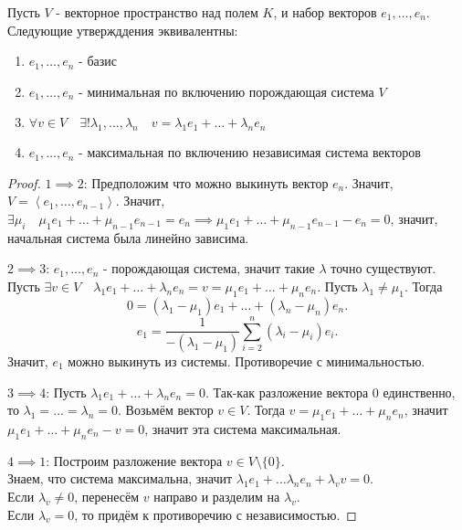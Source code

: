 \begin{statement} \thmslashn

    Пусть $V$ - векторное пространство над полем $K$, и набор векторов $e_1, \ldots, e_{n}$.
    Следующие утвержддения эквивалентны:
    \begin{enumerate}
        \item $e_1, \ldots, e_{n}$ - базис
        \item $e_1, \ldots, e_{n}$ - минимальная по включению порождающая система $V$
        \item $\forall{v\in V}\quad \exists!{\lambda_1, \ldots, \lambda_{n}}\quad v = \lambda_1e_1 + \ldots + \lambda_{n}e_{n}$ 
        \item $e_1, \ldots, e_{n}$ - максимальная по включению независимая система векторов
    \end{enumerate}
    \begin{proof} \thmslashn

        $1 \implies 2$: Предположим что можно выкинуть вектор $e_{n}$. Значит, $V = \left<e_1, \ldots, e_{n-1}\right>$. Значит, $\exists{\mu_{i}}\quad \mu_1e_1 + \ldots + \mu_{n-1}e_{n-1} = e_n \implies \mu_1e_1 + \ldots + \mu_{n-1}e_{n-1} - e_{n} = 0$, значит, начальная система была линейно зависима.

        $2 \implies 3$: $e_1, \ldots, e_{n}$ - порождающая система, значит такие $\lambda$ точно существуют. Пусть $\exists{v\in V}\quad \lambda_1e_1 + \ldots + \lambda_{n}e_{n} = v = \mu_1e_1 + \ldots + \mu_{n}e_{n}$. Пусть $\lambda_1 \neq \mu_1$. Тогда 
        \[ 0 = (\lambda_1 - \mu_1)e_1 + \ldots + (\lambda_{n}-\mu_{n})e_{n} .\]
        \[ e_{1} = \frac{1}{-(\lambda_1-\mu_{1})} \sum\limits_{i=2}^{n}(\lambda_{i}-\mu_{i})e_{i} .\]
        Значит, $e_1$ можно выкинуть из системы. Противоречие с минимальностью.

        $3 \implies 4$: Пусть $\lambda_{1}e_1 + \ldots + \lambda_{n}e_{n} = 0$. Так-как разложение вектора $0$ единственно, то $\lambda_1 = \ldots = \lambda_{n} = 0$. Возьмём вектор $v\in V$. Тогда $v = \mu_1e_1 + \ldots + \mu_{n}e_{n}$, значит $\mu_1e_1 + \ldots + \mu_{n}e_{n} - v = 0$, значит эта система максимальная.

        $4 \implies 1$: Построим разложение вектора $v\in V \setminus \{0\} $.\\
        Знаем, что система максимальна, значит $\lambda_1e_1 + \ldots \lambda_{n}e_{n} + \lambda_{v}v = 0$.\\
        Если $\lambda_{v} \neq  0$, перенесём $v$ направо и разделим на $\lambda_{v}$.\\
        Если $\lambda_{v} = 0$, то придём к противоречию с независимостью.
    \end{proof}
\end{statement}
